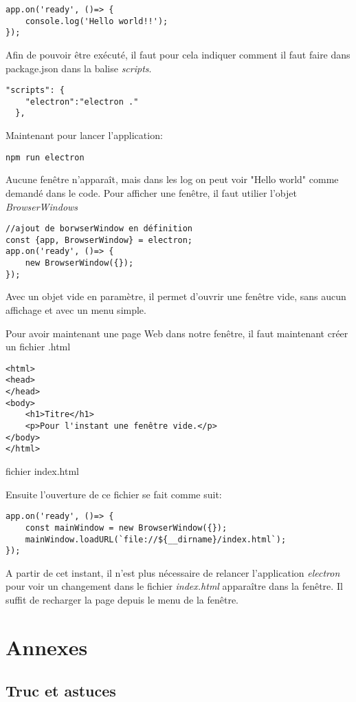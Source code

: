 \documentclass[12pt,oneside]{scrbook}
\begin{document}
\begin{verbatim}
app.on('ready', ()=> {
    console.log('Hello world!!');
});
\end{verbatim}
Afin de pouvoir être exécuté, il faut pour cela indiquer comment il faut faire dans package.json dans la balise \textit{scripts}.
\begin{verbatim}
"scripts": {
    "electron":"electron ."
  },
\end{verbatim}
Maintenant pour lancer l'application:
\begin{verbatim}
npm run electron
\end{verbatim}
Aucune fenêtre n'apparaît, mais dans les log on peut voir "Hello world" comme demandé dans le code. 
Pour afficher une fenêtre, il faut utilier l'objet \textit{BrowserWindows}
\begin{verbatim}
//ajout de borwserWindow en définition
const {app, BrowserWindow} = electron;
app.on('ready', ()=> {
    new BrowserWindow({});
});
\end{verbatim}
Avec un objet vide en paramètre, il permet d'ouvrir une fenêtre vide, sans aucun affichage et avec un menu simple.

Pour avoir maintenant une page Web dans notre fenêtre, il faut maintenant créer un fichier .html
\begin{listing}[ht]
\begin{verbatim}
<html>
<head>
</head>
<body>
    <h1>Titre</h1>
    <p>Pour l'instant une fenêtre vide.</p>
</body>
</html>
\end{verbatim}
\caption{fichier index.html}
\label{listing:0}
\end{listing}
Ensuite l'ouverture de ce fichier se fait comme suit:
\begin{verbatim}
app.on('ready', ()=> {
    const mainWindow = new BrowserWindow({});
    mainWindow.loadURL(`file://${__dirname}/index.html`);
});
\end{verbatim}
A partir de cet instant, il n'est plus nécessaire de relancer l'application \textit{electron} pour voir un changement dans le fichier \textit{index.html} apparaître dans la fenêtre. Il suffit de recharger la page depuis le menu de la fenêtre.

\chapter{Annexes}
\section{Truc et astuces}
\end{document}
